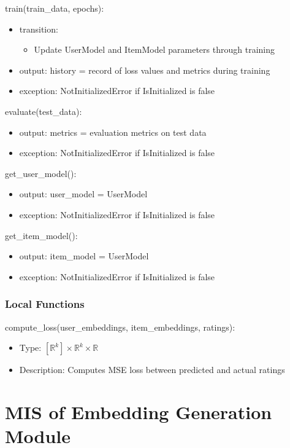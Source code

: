 \documentclass[12pt, titlepage]{article}
\begin{document}
\noindent train(train\_data, epochs):
\begin{itemize}
\item transition:
  \begin{itemize}
    \item Update UserModel and ItemModel parameters through training
  \end{itemize}
\item output: history = record of loss values and metrics during training
\item exception: NotInitializedError if IsInitialized is false
\end{itemize}

\noindent evaluate(test\_data):
\begin{itemize}
\item output: metrics = evaluation metrics on test data
\item exception: NotInitializedError if IsInitialized is false
\end{itemize}

\noindent get\_user\_model():
\begin{itemize}
\item output: user\_model = UserModel
\item exception: NotInitializedError if IsInitialized is false
\end{itemize}
\noindent get\_item\_model():
\begin{itemize}
\item output: item\_model = UserModel
\item exception: NotInitializedError if IsInitialized is false
\end{itemize}

\subsubsection{Local Functions}
compute\_loss(user\_embeddings, item\_embeddings, ratings):
\begin{itemize}
  \item Type: $[\mathbb{R}^k]\times\mathbb{R}^k\times \mathbb{R}$
  \item Description: Computes MSE loss between predicted and actual ratings
\end{itemize}

\section{MIS of Embedding Generation Module} \label{ModuleEG}
\end{document}

